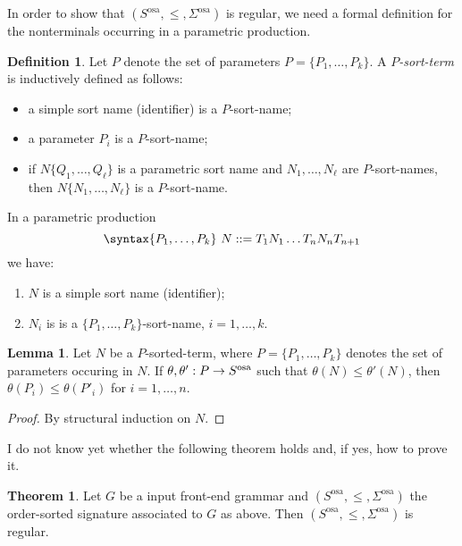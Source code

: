 \documentclass{article}
\theoremstyle{definition}
\theoremstyle{definition}
\newtheorem{definition}{Definition}[section]
\theoremstyle{definition}
\theoremstyle{theorem}
\newtheorem{theorem}{Theorem}[section]
\theoremstyle{theorem}
\theoremstyle{theorem}
\newtheorem{lemma}{Lemma}[section]
\begin{document}
{In order to show that $(S^\textrm{osa},\le, \Sigma^\textrm{osa})$ is regular, we need a formal definition for the nonterminals occurring in a parametric production.
\begin{definition}
Let $P$ denote the set of parameters $P=\{P_1,\ldots,P_k\}$. A \emph{$P$-sort-term} is inductively defined as follows:
\begin{itemize}
\item a simple sort name (identifier) is a $P$-sort-name;
\item a parameter $P_i$ is a $P$-sort-name;
\item if $N\{Q_1,\ldots,Q_\ell\}$ is a parametric sort name and $N_1,\ldots,N_\ell$ are $P$-sort-names, then $N\{N_1,\ldots,N_\ell\}$ is a $P$-sort-name.
\end{itemize}
\end{definition}

In a parametric production
\[\syntax\{P_1,\ldots,P_k\}\ N ::= T_1 N_1 \ldots T_n N_n T_{n+1}\]
we have:
\begin{enumerate}
\item $N$ is a simple sort name (identifier);
\item $N_i$ is is a $\{P_1,\ldots,P_k\}$-sort-name, $i=1,\ldots,k$.
\end{enumerate}
\begin{lemma}
Let $N$ be a $P$-sorted-term, where $P=\{P_1,\ldots,P_k\}$ denotes the set of parameters occuring in $N$. If $\theta,\theta':P\to S^{\rm osa}$ such that $\theta(N)\le\theta'(N)$, then $\theta(P_i)\le \theta(P'_i)$ for $i=1,\ldots,n$.
\end{lemma}
\begin{proof}
By structural induction on $N$.
\end{proof}

I do not know yet whether the following theorem holds and, if yes, how to prove it.
\begin{theorem}
Let $G$ be a input front-end grammar and $(S^\textrm{osa},\le, \Sigma^\textrm{osa})$ the order-sorted signature associated to $G$ as above.
Then $(S^\textrm{osa},\le, \Sigma^\textrm{osa})$ is regular.
\end{theorem}

}
\end{document}
